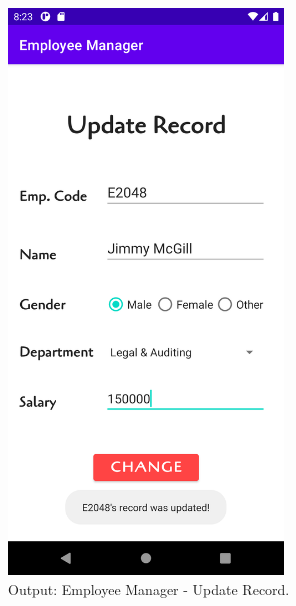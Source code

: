 \documentclass[12pt, a4]{article}
\begin{document}
\subsection*{}
\begin{figure}[h]
\centering
\caption{Output: Employee Manager - Update Record.}
\includegraphics[height=15cm, width=7.3cm]{EmployeeManager/Screenshots/Output-4.png}
\end{figure}

\newpage
\end{document}
